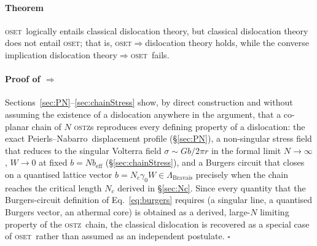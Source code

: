 \documentclass[3p]{elsarticle}
\newcommand{\OSTZ}{\textsc{ostz}}
\newcommand{\OSET}{\textsc{oset}}
\newcommand{\gz}{\gamma_0}
\newcommand{\beff}{b_\mathrm{eff}}
\newcommand{\PN}{Peierls--Nabarro}
\begin{document}
\paragraph{Theorem} \OSET\ logically entails classical dislocation
theory, but classical dislocation theory does not entail \OSET; that
is, \OSET$\Rightarrow$dislocation theory holds, while the converse
implication dislocation theory$\Rightarrow$\OSET\ fails.

\paragraph{Proof of $\Rightarrow$} Sections~\ref{sec:PN}--\ref{sec:chainStress}
show, by direct construction and without assuming the existence of a
dislocation anywhere in the argument, that a co-planar chain of $N$
\OSTZ s reproduces every defining property of a dislocation: the
exact \PN\ displacement profile (\S\ref{sec:PN}), a non-singular
stress field that reduces to the singular Volterra field
$\sigma\sim Gb/2\pi r$ in the formal limit $N\to\infty$, $W\to0$ at
fixed $b=N\beff$ (\S\ref{sec:chainStress}), and a Burgers circuit
that closes on a quantised lattice vector $b=N_c\gz W\in
\Lambda_\mathrm{Bravais}$ precisely when the chain reaches the
critical length $N_c$ derived in \S\ref{sec:Nc}. Since every
quantity that the Burgers-circuit definition of
Eq.~\eqref{eq:burgers} requires (a singular line, a quantised
Burgers vector, an athermal core) is obtained as a derived,
large-$N$ limiting property of the \OSTZ\ chain, the classical
dislocation is recovered as a special case of \OSET\ rather than
assumed as an independent postulate. $\square$
\end{document}
